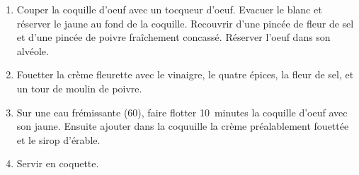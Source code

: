 
\begin{ingredients}
\end{ingredients}


\begin{recipe}
  \begin{enumerate}

  \item Couper la coquille d'oeuf avec un tocqueur d'oeuf.  Evacuer le
    blanc et r\'eserver le jaune au fond de la coquille.  Recouvrir
    d'une pinc\'ee de fleur de sel et d'une pinc\'ee de poivre
    fra\^ichement concass\'e.  R\'eserver l'oeuf dans son alv\'eole.

  \item Fouetter la cr\`eme fleurette avec le vinaigre, le quatre
    \'epices, la fleur de sel, et un tour de moulin de poivre.

  \item Sur une eau fr\'emissante (60\degreeC), faire flotter 10~minutes la
    coquille d'oeuf avec son jaune.  Ensuite ajouter dans la coquuille
    la cr\`eme pr\'ealablement fouett\'ee et le sirop d'\'erable.

  \item Servir en coquette.

  \end{enumerate}
\end{recipe}
